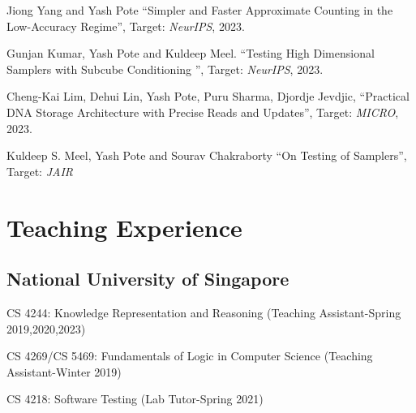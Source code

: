 \documentclass[12pt,letterpaper]{report}
\newcommand{\listitemspace}{0.15em}
\renewenvironment{itemize}
{\begin{list}{}{\setlength{\leftmargin}{0em}
            \setlength{\parskip}{0em}
            \setlength{\itemsep}{\listitemspace}
            \setlength{\parsep}{\listitemspace}}}
    {\end{list}}
\begin{document}
    \begin{tablist}
    	\item[\the\year] \tab Jiong Yang and Yash Pote
    	\enquote{Simpler and Faster Approximate Counting in the Low-Accuracy Regime}, Target: \textit{NeurIPS},  2023.
    	
		\item[\the\year] \tab  Gunjan Kumar, Yash Pote and  Kuldeep Meel.
		\enquote{Testing High Dimensional Samplers with Subcube Conditioning }, Target: \textit{NeurIPS},  2023.
		
		
		\item[\the\year] \tab  Cheng-Kai Lim, Dehui Lin, Yash Pote,  Puru Sharma, Djordje Jevdjic, \enquote{Practical DNA Storage Architecture with Precise Reads and
			Updates}, Target: \textit{MICRO},  2023.
			
		\item[\the\year] \tab Kuldeep S. Meel, Yash Pote  and Sourav Chakraborty \enquote{On Testing of Samplers}, Target: \textit{JAIR}
	
    \end{tablist}


    \section*{Teaching Experience}

    \subsection*{National University of Singapore}
    
    \begin{itemize}
    	  	
 \item   CS 4244: Knowledge Representation and Reasoning (Teaching Assistant-Spring 2019,2020,2023)
  \item   CS 4269/CS 5469: Fundamentals of Logic in Computer Science (Teaching Assistant-Winter 2019)
  \item   CS 4218: Software Testing (Lab Tutor-Spring 2021)
    
	\end{itemize}
    
\end{document}
